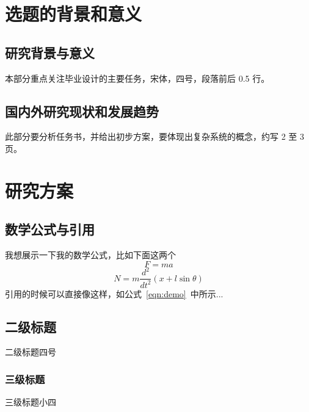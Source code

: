 \documentclass[UTF8,AutoFakeBold,AutoFakeSlant,zihao=-4]{ctexart}
\numberwithin{equation}{section}
\numberwithin{equation}{section}
\begin{document}
\newpage
\section{选题的背景和意义}
\begin{ubox}
\setcounter{figure}{0}
\setcounter{table}{0}
\setlength{\baselineskip}{22pt}
\subsection{研究背景与意义}
本部分重点关注毕业设计的主要任务，宋体，四号，段落前后 0.5 行。

\subsection{国内外研究现状和发展趋势}
此部分要分析任务书，并给出初步方案，要体现出复杂系统的概念，约写 2 至 3 页。
\end{ubox}



\newpage
\section{研究方案}
\begin{ubox}
\setcounter{figure}{0}
\setcounter{table}{0}
\setlength{\baselineskip}{22pt}
\subsection{数学公式与引用}

我想展示一下我的数学公式，比如下面这两个
\begin{equation}\label{eqn:demo}
	F = ma
\end{equation}
\begin{equation}
	N=m \frac{d^{2}}{d t^{2}}(x+l \sin \theta)
\end{equation}
引用的时候可以直接像这样，如公式~\ref{eqn:demo}~中所示...


\subsection{二级标题}

二级标题四号

\subsubsection{三级标题}

三级标题小四

\end{ubox}
\end{document}

